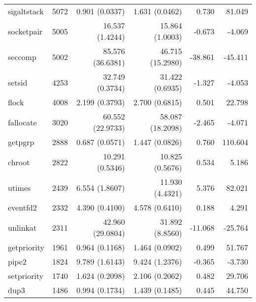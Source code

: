 \begin{longtable}{>{\ttfamily}lrrrrr}
                    sigaltstack &       5072 &           0.901 (0.0337) &           1.631 (0.0462) &           0.730 &       81.049 \\
                     socketpair &       5005 &          16.537 (1.4244) &          15.864 (1.0003) &          -0.673 &       -4.069 \\
                        seccomp &       5002 &         85.576 (36.6381) &         46.715 (15.2980) &         -38.861 &      -45.411 \\
                         setsid &       4253 &          32.749 (0.3734) &          31.422 (0.6935) &          -1.327 &       -4.053 \\
                          flock &       4008 &           2.199 (0.3793) &           2.700 (0.6815) &           0.501 &       22.798 \\
                      fallocate &       3020 &         60.552 (22.9733) &         58.087 (18.2098) &          -2.465 &       -4.071 \\
                        getpgrp &       2888 &           0.687 (0.0571) &           1.447 (0.0826) &           0.760 &      110.604 \\
                         chroot &       2822 &          10.291 (0.5346) &          10.825 (0.5676) &           0.534 &        5.186 \\
                         utimes &       2439 &           6.554 (1.8607) &          11.930 (4.4321) &           5.376 &       82.021 \\
                       eventfd2 &       2332 &           4.390 (0.4100) &           4.578 (0.6410) &           0.188 &        4.291 \\
                       unlinkat &       2311 &         42.960 (29.0804) &          31.892 (8.8560) &         -11.068 &      -25.764 \\
                    getpriority &       1961 &           0.964 (0.1168) &           1.464 (0.0902) &           0.499 &       51.767 \\
                          pipe2 &       1824 &           9.789 (1.6143) &           9.424 (1.2376) &          -0.365 &       -3.730 \\
                    setpriority &       1740 &           1.624 (0.2098) &           2.106 (0.2062) &           0.482 &       29.706 \\
                           dup3 &       1486 &           0.994 (0.1734) &           1.439 (0.1485) &           0.445 &       44.750 \\

\end{longtable}
